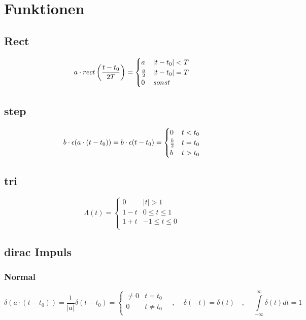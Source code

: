 \documentclass[10pt,a4paper]{article}
\begin{document}
\section{Funktionen}
\subsection{Rect}
\[ a\cdot rect\left(\frac{t-t_0}{2T}\right) = \begin{cases}
a & |t-t_0| < T \\
a\over 2 & |t-t_0| = T \\
0 & sonst \\
\end{cases} \]

\subsection{step}
\[b\cdot\epsilon(a\cdot (t-t_0)) = b\cdot\epsilon(t-t_0) =
\begin{cases}
0 & t < t_0 \\
b \over 2 & t=t_0\\
b & t > t_0\\
\end{cases}\]

\subsection{tri}
\[\Lambda(t) =
\begin{cases}
0& |t|>1\\
1-t & 0 \leq t \leq 1\\
1+t & -1 \leq t \leq 0\\
\end{cases} \]

\subsection{dirac Impuls}
\subsubsection{Normal}
\[ \delta(a\cdot (t-t_0)) = \frac{1}{|a|} \delta(t-t_0) =
\begin{cases}
\neq 0 & t=t_0\\
0 & t \neq t_0\\
\end{cases}\,\,\,\,\,\,,\,\,\,\,\,\,\, \delta(-t)=\delta(t)
\,\,\,\,\,\,,\,\,\,\,\,\,\,\int\limits_{-\infty}^\infty \delta(t) dt = 1 \]
\end{document}
